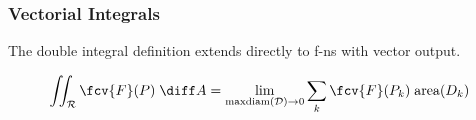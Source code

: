 \begin{frame}
\frametitle{Vectorial Integrals}
The double integral definition extends directly to f-ns with vector output.
\begin{definition}
\[
\iint_{\mathcal{R}} \fcv{F}(P) \; \diff A = \lim_{\text{maxdiam}(\mathcal{D}) \to 0} \sum_k \fcv{F}(P_k) \; \text{area}(D_k)
\]
\end{definition}

\end{frame}